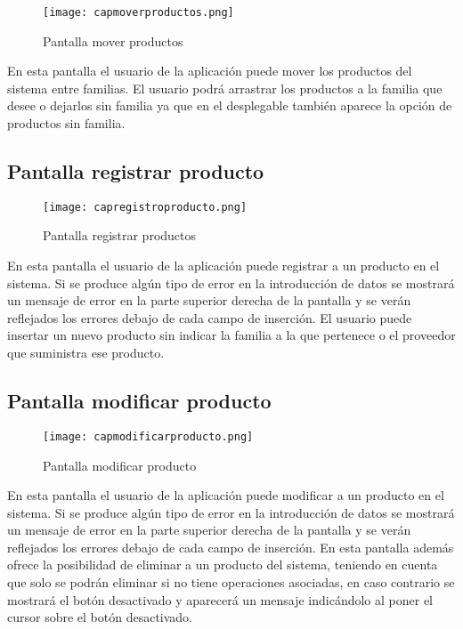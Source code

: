 \begin{figure}[!htb]
  \centering
    \texttt{[image: capmoverproductos.png]}
  \caption{Pantalla mover productos}
  \label{a}
\end{figure}

En esta pantalla el usuario de la aplicación puede mover los productos del sistema entre familias. El usuario podrá arrastrar los productos a la familia que desee o dejarlos sin familia ya que en el desplegable también aparece la opción de productos sin familia.

\subsection {Pantalla registrar producto}

\begin{figure}[!htb]
  \centering
    \texttt{[image: capregistroproducto.png]}
  \caption{Pantalla registrar productos}
  \label{a}
\end{figure}

En esta pantalla el usuario de la aplicación puede registrar a un producto en el sistema. Si se produce algún tipo de error en la introducción de datos se mostrará un mensaje de error en la parte superior derecha de la pantalla y se verán reflejados los errores debajo de cada campo de inserción. El usuario puede insertar un nuevo producto sin indicar la familia a la que pertenece o el proveedor que suministra ese producto.


\subsection {Pantalla modificar producto}

\begin{figure}[!htb]
  \centering
    \texttt{[image: capmodificarproducto.png]}
  \caption{Pantalla modificar producto}
  \label{a}
\end{figure}

En esta pantalla el usuario de la aplicación puede modificar a un producto en el sistema. Si se produce algún tipo de error en la introducción de datos se mostrará un mensaje de error en la parte superior derecha de la pantalla y se verán reflejados los errores debajo de cada campo de inserción. En esta pantalla además ofrece la posibilidad de eliminar a un producto del sistema, teniendo en cuenta que solo se podrán eliminar si no tiene operaciones asociadas, en caso contrario se mostrará el botón desactivado y aparecerá un mensaje indicándolo al poner el cursor sobre el botón desactivado.
\newpage
